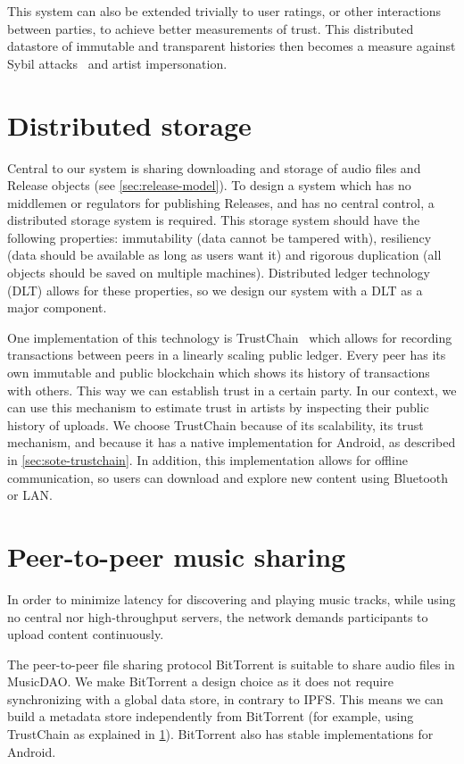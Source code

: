 This system can also be extended trivially to user ratings, or other interactions between parties, to achieve better measurements of trust. This distributed datastore of immutable and transparent histories then becomes a measure against Sybil attacks~\citep{douceur2002sybil} and artist impersonation.

\section{Distributed storage}
\label{sec:distributed-storage}
Central to our system is sharing downloading and storage of audio files and Release objects (see \ref{sec:release-model}). To design a system which has no middlemen or regulators for publishing Releases, and has no central control, a distributed storage system is required. This storage system should have the following properties: immutability (data cannot be tampered with), resiliency (data should be available as long as users want it) and rigorous duplication (all objects should be saved on multiple machines). Distributed ledger technology (DLT) allows for these properties, so we design our system with a DLT as a major component.

One implementation of this technology is TrustChain~\citep{otte2017trustchain} which allows for recording transactions between peers in a linearly scaling public ledger. Every peer has its own immutable and public blockchain which shows its history of transactions with others. This way we can establish trust in a certain party. In our context, we can use this mechanism to estimate trust in artists by inspecting their public history of uploads. We choose TrustChain because of its scalability, its trust mechanism, and because it has a native implementation for Android, as described in \ref{sec:sote-trustchain}. In addition, this implementation allows for offline communication, so users can download and explore new content using Bluetooth or LAN.

\section{Peer-to-peer music sharing}
\label{sec:p2p-music-sharing}
In order to minimize latency for discovering and playing music tracks, while using no central nor high-throughput servers, the network demands participants to upload content continuously. 

The peer-to-peer file sharing protocol BitTorrent is suitable to share audio files in MusicDAO. We make BitTorrent a design choice as it does not require synchronizing with a global data store, in contrary to IPFS. This means we can build a metadata store independently from BitTorrent (for example, using TrustChain as explained in \ref{sec:distributed-storage}). BitTorrent also has stable implementations for Android.

